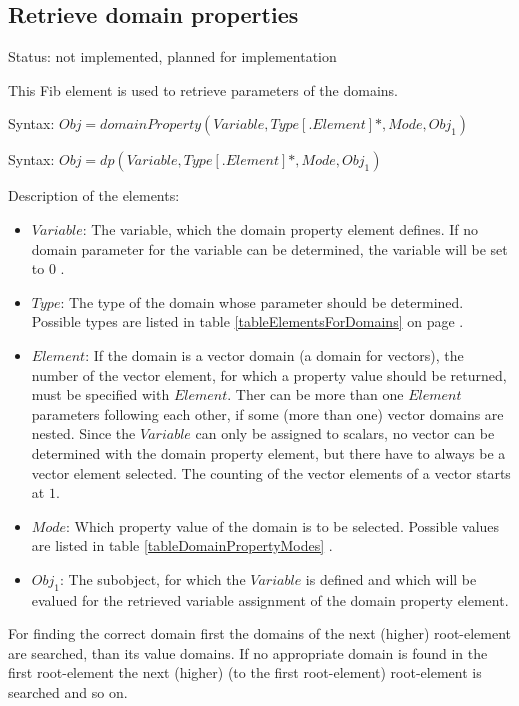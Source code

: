

\subsection{Retrieve domain properties}
\label{fibDomeinProperties}

Status: not implemented, planned for implementation

\bigskip\noindent
This Fib element is used to retrieve parameters of the domains.

\bigskip\noindent
Syntax:
$Obj = domainProperty( Variable , Type[.Element]*, Mode, Obj_1 )$

\bigskip\noindent
Syntax:
$Obj = dp( Variable, Type[.Element]*, Mode, Obj_1 )$

\bigskip\noindent
Description of the elements:
\begin{itemize}
 \item $Variable$: The variable, which the domain property element defines. If no domain parameter for the variable can be determined, the variable will be set to $0$ .
 \item $Type$: The type of the domain whose parameter should be determined. Possible types are listed in table \ref{tableElementsForDomains} on page \pageref{tableElementsForDomains}.
 \item $Element$: If the domain is a vector domain (a domain for vectors), the number of the vector element, for which a property value should be returned, must be specified with $Element$. Ther can be more than one $Element$ parameters following each other, if some (more than one) vector domains are nested. Since the $Variable$ can only be assigned to scalars, no vector can be determined with the domain property element, but there have to always be a vector element selected. The counting of the vector elements of a vector starts at $1$.
 \item $Mode$: Which property value of the domain is to be selected. Possible values are listed in table \ref{tableDomainPropertyModes} .
 \item $Obj_1$: The subobject, for which the $Variable$ is defined and which will be evalued for the retrieved variable assignment of the domain property element.
\end{itemize}

For finding the correct domain first the domains of the next (higher) root-element are searched, than its value domains. If no appropriate domain is found in the first root-element the next (higher) (to the first root-element) root-element is searched and so on.

